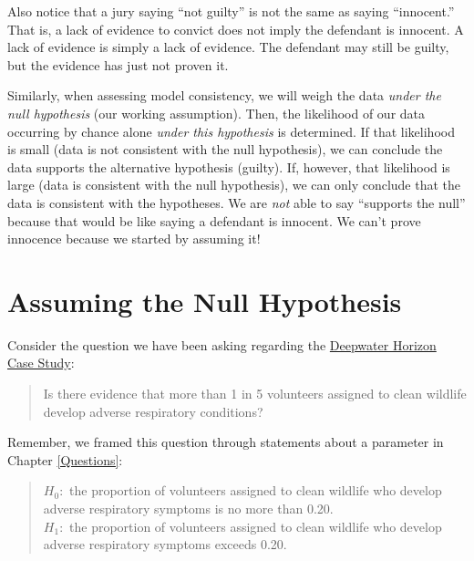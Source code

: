 \documentclass[]{book}
\theoremstyle{plain}
\theoremstyle{mydefn}
\theoremstyle{myexmpl}
\theoremstyle{remark}
\begin{document}
Also notice that a jury saying ``not guilty'' is not the same as saying
``innocent.'' That is, a lack of evidence to convict does not imply the
defendant is innocent. A lack of evidence is simply a lack of evidence.
The defendant may still be guilty, but the evidence has just not proven
it.

Similarly, when assessing model consistency, we will weigh the data
\emph{under the null hypothesis} (our working assumption). Then, the
likelihood of our data occurring by chance alone \emph{under this
hypothesis} is determined. If that likelihood is small (data is not
consistent with the null hypothesis), we can conclude the data supports
the alternative hypothesis (guilty). If, however, that likelihood is
large (data is consistent with the null hypothesis), we can only
conclude that the data is consistent with the hypotheses. We are
\emph{not} able to say ``supports the null'' because that would be like
saying a defendant is innocent. We can't prove innocence because we
started by assuming it!

\section{Assuming the Null
Hypothesis}\label{assuming-the-null-hypothesis}

Consider the question we have been asking regarding the
\protect\hyperlink{CaseDeepwater}{Deepwater Horizon Case Study}:

\begin{quote}
Is there evidence that more than 1 in 5 volunteers assigned to clean
wildlife develop adverse respiratory conditions?
\end{quote}

Remember, we framed this question through statements about a parameter
in Chapter \ref{Questions}:

\begin{quote}
\(H_0:\) the proportion of volunteers assigned to clean wildlife who
develop adverse respiratory symptoms is no more than 0.20.\\
\(H_1:\) the proportion of volunteers assigned to clean wildlife who
develop adverse respiratory symptoms exceeds 0.20.
\end{quote}
\end{document}
